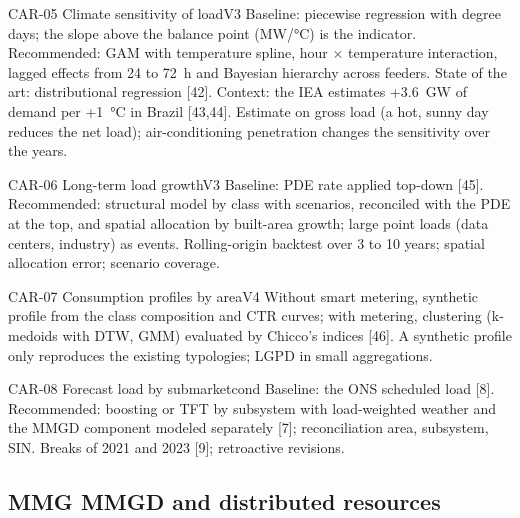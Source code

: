 \begin{ficha}{CAR-05 \textperiodcentered{} Climate sensitivity of load}{V3}
 Baseline: piecewise regression with degree days; the
slope above the balance point (MW/°C) is the indicator. Recommended:
GAM with temperature spline, hour × temperature interaction, lagged
effects from 24 to 72~h and Bayesian hierarchy across feeders. State of the
art: distributional regression [42]. Context: the IEA estimates +3.6~GW of demand
per +1~°C in Brazil [43,44].
 Estimate on gross load (a hot, sunny day reduces
the net load); air-conditioning penetration changes the sensitivity over the years.
\end{ficha}

\begin{ficha}{CAR-06 \textperiodcentered{} Long-term load growth}{V3}
 Baseline: PDE rate applied top-down
[45]. Recommended: structural model by class with scenarios, reconciled with
the PDE at the top, and spatial allocation by built-area growth;
large point loads (data centers, industry) as events.
 Rolling-origin backtest over 3 to 10 years; spatial
allocation error; scenario coverage.
\end{ficha}

\begin{ficha}{CAR-07 \textperiodcentered{} Consumption profiles by area}{V4}
 Without smart metering, synthetic profile from the class
composition and CTR curves; with metering, clustering (k-medoids with DTW, GMM)
evaluated by Chicco's indices [46].
 A synthetic profile only reproduces the existing typologies;
LGPD in small aggregations.
\end{ficha}

\begin{ficha}{CAR-08 \textperiodcentered{} Forecast load by submarket}{cond}
 Baseline: the ONS scheduled load [8].
Recommended: boosting or TFT by subsystem with load-weighted weather and the
MMGD component modeled separately [7]; reconciliation area, subsystem, SIN.
 Breaks of 2021 and 2023 [9]; retroactive revisions.
\end{ficha}

\subsection{MMG \textperiodcentered{} MMGD and distributed resources}

